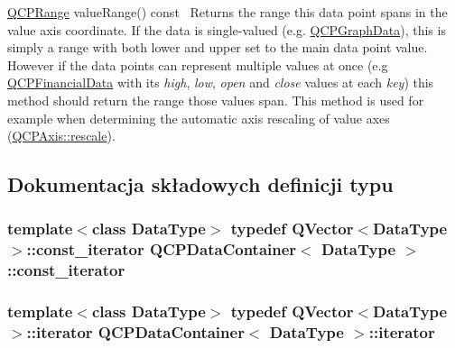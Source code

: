 \begin{DoxyItemize}
\item {\ttfamily \hyperlink{class_q_c_p_range}{Q\+C\+P\+Range} value\+Range() const}~\newline
 Returns the range this data point spans in the value axis coordinate. If the data is single-\/valued (e.\+g. \hyperlink{class_q_c_p_graph_data}{Q\+C\+P\+Graph\+Data}), this is simply a range with both lower and upper set to the main data point value. However if the data points can represent multiple values at once (e.\+g \hyperlink{class_q_c_p_financial_data}{Q\+C\+P\+Financial\+Data} with its {\itshape high}, {\itshape low}, {\itshape open} and {\itshape close} values at each {\itshape key}) this method should return the range those values span. This method is used for example when determining the automatic axis rescaling of value axes (\hyperlink{class_q_c_p_axis_a499345f02ebce4b23d8ccec96e58daa9}{Q\+C\+P\+Axis\+::rescale}). \end{DoxyItemize}


\subsection{Dokumentacja składowych definicji typu}
\subsubsection[{\texorpdfstring{const\+\_\+iterator}{const_iterator}}]{\setlength{\rightskip}{0pt plus 5cm}template$<$class Data\+Type$>$ typedef Q\+Vector$<$Data\+Type$>$\+::{\bf const\+\_\+iterator} {\bf Q\+C\+P\+Data\+Container}$<$ Data\+Type $>$\+::{\bf const\+\_\+iterator}}\hypertarget{class_q_c_p_data_container_ae40a91f5cb0bcac61d727427449b7d15}{}\label{class_q_c_p_data_container_ae40a91f5cb0bcac61d727427449b7d15}
\subsubsection[{\texorpdfstring{iterator}{iterator}}]{\setlength{\rightskip}{0pt plus 5cm}template$<$class Data\+Type$>$ typedef Q\+Vector$<$Data\+Type$>$\+::{\bf iterator} {\bf Q\+C\+P\+Data\+Container}$<$ Data\+Type $>$\+::{\bf iterator}}\hypertarget{class_q_c_p_data_container_a1bb453c3ae37d1ee5268878acb3a9d29}{}\label{class_q_c_p_data_container_a1bb453c3ae37d1ee5268878acb3a9d29}


